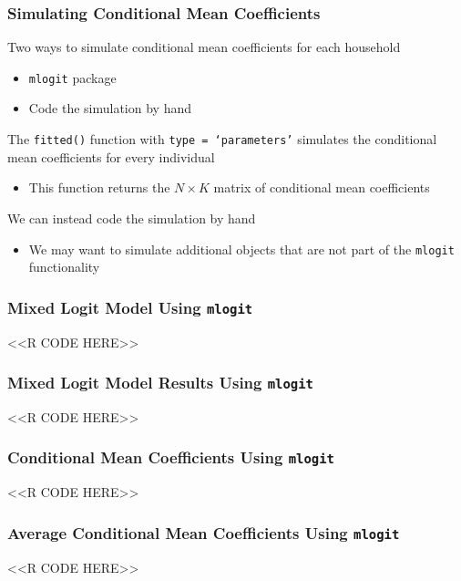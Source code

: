 \documentclass{beamer}
\begin{document}
\begin{frame}\frametitle{Simulating Conditional Mean Coefficients}
    Two ways to simulate conditional mean coefficients for each household
    \begin{itemize}
        \item \texttt{mlogit} package
        \item Code the simulation by hand
    \end{itemize}
    \vspace{3ex}
    The \texttt{fitted()} function with \texttt{type = `parameters'} simulates the conditional mean coefficients for every individual
    \begin{itemize}
        \item This function returns the $N \times K$ matrix of conditional mean coefficients
    \end{itemize}
    \vspace{3ex}
    We can instead code the simulation by hand
    \begin{itemize}
        \item We may want to simulate additional objects that are not part of the \texttt{mlogit} functionality
    \end{itemize}
\end{frame}

\begin{frame}[fragile]\frametitle{Mixed Logit Model Using \texttt{mlogit}}
    <<R CODE HERE>>
\end{frame}

\begin{frame}[fragile]\frametitle{Mixed Logit Model Results Using \texttt{mlogit}}
    \vspace{1ex}
    <<R CODE HERE>>
\end{frame}

\begin{frame}[fragile]\frametitle{Conditional Mean Coefficients Using \texttt{mlogit}}
    <<R CODE HERE>>
\end{frame}

\begin{frame}[fragile]\frametitle{Average Conditional Mean Coefficients Using \texttt{mlogit}}
    <<R CODE HERE>>
\end{frame}
\end{document}
